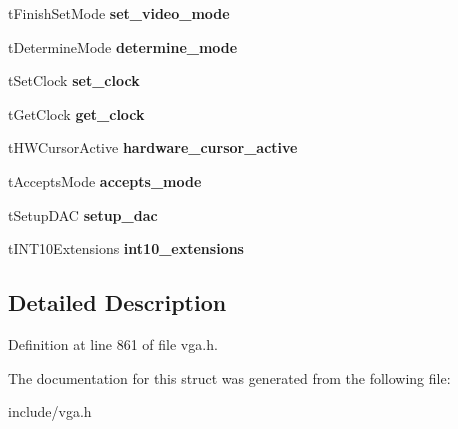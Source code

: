 \begin{DoxyCompactItemize}
\item 
\hypertarget{structSVGA__Driver_afad168056782b84b2eec03c3e0b6f132}{t\-Finish\-Set\-Mode {\bfseries set\-\_\-video\-\_\-mode}}\label{structSVGA__Driver_afad168056782b84b2eec03c3e0b6f132}

\item 
\hypertarget{structSVGA__Driver_a2d72eb682afc752821c0f1ec4e3d0ce3}{t\-Determine\-Mode {\bfseries determine\-\_\-mode}}\label{structSVGA__Driver_a2d72eb682afc752821c0f1ec4e3d0ce3}

\item 
\hypertarget{structSVGA__Driver_a59225904a80dbe9f92d9ba2ee227e1f8}{t\-Set\-Clock {\bfseries set\-\_\-clock}}\label{structSVGA__Driver_a59225904a80dbe9f92d9ba2ee227e1f8}

\item 
\hypertarget{structSVGA__Driver_a209ef280bb27f00d2226050998cd5cb0}{t\-Get\-Clock {\bfseries get\-\_\-clock}}\label{structSVGA__Driver_a209ef280bb27f00d2226050998cd5cb0}

\item 
\hypertarget{structSVGA__Driver_a3936aa6067ba314fe1aa38fbc89933cd}{t\-H\-W\-Cursor\-Active {\bfseries hardware\-\_\-cursor\-\_\-active}}\label{structSVGA__Driver_a3936aa6067ba314fe1aa38fbc89933cd}

\item 
\hypertarget{structSVGA__Driver_a80ae597edcf43eeb150550b23752729c}{t\-Accepts\-Mode {\bfseries accepts\-\_\-mode}}\label{structSVGA__Driver_a80ae597edcf43eeb150550b23752729c}

\item 
\hypertarget{structSVGA__Driver_a5968c7cd8b28c97aea5860fbe6433e02}{t\-Setup\-D\-A\-C {\bfseries setup\-\_\-dac}}\label{structSVGA__Driver_a5968c7cd8b28c97aea5860fbe6433e02}

\item 
\hypertarget{structSVGA__Driver_aff7ace887c47e1f700375eb6324b1d91}{t\-I\-N\-T10\-Extensions {\bfseries int10\-\_\-extensions}}\label{structSVGA__Driver_aff7ace887c47e1f700375eb6324b1d91}

\end{DoxyCompactItemize}


\subsection{Detailed Description}


Definition at line 861 of file vga.\-h.



The documentation for this struct was generated from the following file\-:\begin{DoxyCompactItemize}
\item 
include/vga.\-h\end{DoxyCompactItemize}

